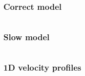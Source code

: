
\begin{frame} \frametitle{Correct model}
\begin{columns} 
\end{columns}
\end{frame}

\begin{frame} \frametitle{Slow model}
\begin{columns} 
\end{columns}
\end{frame}

\begin{frame} \frametitle{1D velocity profiles}  \end{frame}



\begin{frame}  
\end{frame}

\begin{frame}  
\end{frame}



%
%

